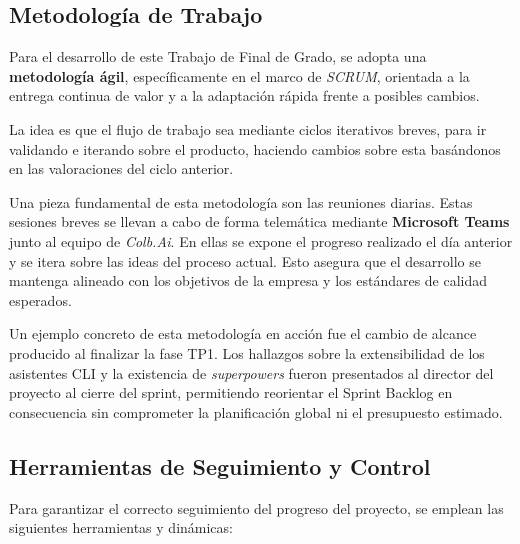 \documentclass[11pt, letterpaper]{article}
\begin{document}
\subsection{Metodología de Trabajo}
\label{sec:metodologia_trabajo}
Para el desarrollo de este Trabajo de Final de Grado, se adopta una \textbf{metodología ágil}, específicamente en el marco de \textit{SCRUM}, orientada a la entrega continua de valor y a la adaptación rápida frente a posibles cambios. 

La idea es que el flujo de trabajo sea mediante ciclos iterativos breves, para ir validando e iterando sobre el producto, haciendo cambios sobre esta basándonos en las valoraciones del ciclo anterior. \cite{modul2_1} \cite{schwaber_scrum_2020}

Una pieza fundamental de esta metodología son las reuniones diarias. Estas sesiones breves se llevan a cabo de forma telemática mediante \textbf{Microsoft Teams} junto al equipo de \textit{Colb.Ai}. En ellas se expone el progreso realizado el día anterior y se itera sobre las ideas del proceso actual. Esto asegura que el desarrollo se mantenga alineado con los objetivos de la empresa y los estándares de calidad esperados.

Un ejemplo concreto de esta metodología en acción fue el cambio de alcance producido al finalizar la fase TP1. Los hallazgos sobre la extensibilidad de los asistentes CLI y la existencia de \textit{superpowers} fueron presentados al director del proyecto al cierre del sprint, permitiendo reorientar el Sprint Backlog en consecuencia sin comprometer la planificación global ni el presupuesto estimado.

\subsection{Herramientas de Seguimiento y Control}
\label{sec:herramientas_seguimiento}
Para garantizar el correcto seguimiento del progreso del proyecto, se emplean las siguientes herramientas y dinámicas:
\end{document}

